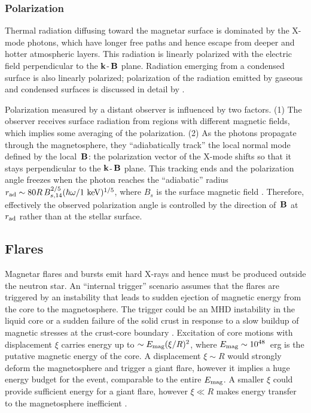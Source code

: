 \subsubsection{Polarization}


Thermal radiation diffusing toward the magnetar surface is dominated by the X-mode 
photons, which have longer free paths and hence escape from deeper and hotter 
atmospheric layers. This radiation is linearly polarized with the electric field perpendicular
to the ${\mathbf k}$-${\,\mathbf B}$ plane. Radiation emerging from a condensed surface is also 
linearly polarized; polarization of the radiation emitted by gaseous and condensed 
surfaces is discussed in detail by \citet{ttg+15}.

Polarization measured by a distant observer is influenced by two factors. 
(1) The observer receives surface radiation from regions with different magnetic fields,
which implies some averaging of the polarization.
(2) As the photons propagate through the magnetosphere, they ``adiabatically track'' 
the local normal mode defined by the local ${\,\mathbf B}$: the polarization vector of the 
X-mode shifts so that it stays perpendicular to the ${\mathbf k}$-${\,\mathbf B}$ plane.
This tracking ends and the polarization angle freezes when the photon reaches the
``adiabatic'' radius $r_{\rm ad}\sim 80 R\, B_{s,14}^{2/5}(\hbar\omega/1{\rm~keV})^{1/5}$,
where $B_s$ is the surface magnetic field \citep{hsl03}.
Therefore, effectively the observed polarization angle is controlled by the direction of 
${\,\mathbf B}$ at $r_{\rm ad}$ rather than at the stellar surface. 


\subsection{Flares}


Magnetar flares and bursts emit hard X-rays and hence must be produced outside 
the neutron star. An ``internal trigger'' scenario assumes that the flares are
 triggered by an instability that leads to sudden ejection of magnetic 
energy from the core to the magnetosphere. The trigger 
could be an MHD instability in the liquid core or a sudden failure of the solid crust 
in response to a slow buildup of magnetic stresses at the crust-core boundary
\citep{td95,td01}. Excitation of core motions with displacement $\xi$  carries energy 
up to $\sim E_{\rm mag} (\xi/R)^2$, where $E_{\rm mag}\sim 10^{48}$~erg is the putative 
magnetic energy of the core. A displacement $\xi\sim R$ would strongly deform the 
magnetosphere and trigger a giant flare, however it implies a huge 
energy budget for the event, comparable to the entire $E_{\rm mag}$.
A smaller $\xi$ could provide sufficient energy for a giant flare,
however  $\xi\ll R$ makes energy transfer to the magnetosphere inefficient \citep{lin14}.

